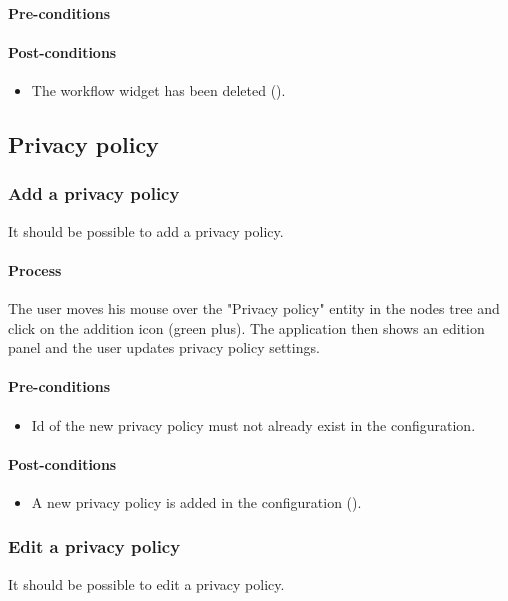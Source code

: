 \documentclass[11pt,a4paper,oneside]{article}
\begin{document}
\paragraph{Pre-conditions}

\paragraph{Post-conditions}
\begin{itemize}
	\item The workflow widget has been deleted ().
\end{itemize}

\subsection{Privacy policy}

\subsubsection{Add a privacy policy}
It should be possible to add a privacy policy.

\paragraph{Process}
The user moves his mouse over the "Privacy policy" entity in the nodes tree and click on the addition icon (green plus). The application then shows an edition panel and the user updates privacy policy settings.

\paragraph{Pre-conditions}
\begin{itemize}
	\item Id of the new privacy policy must not already exist in the configuration.
\end{itemize}

\paragraph{Post-conditions}
\begin{itemize}
	\item A new privacy policy is added in the configuration ().
\end{itemize}

\subsubsection{Edit a privacy policy}
It should be possible to edit a privacy policy.
\end{document}
